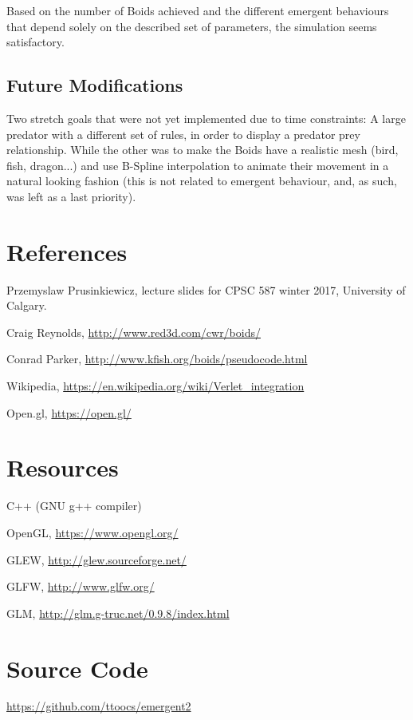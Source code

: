 \documentclass[12pt]{article}
\begin{document}
Based on the number of Boids achieved and the different emergent behaviours that depend solely on the described set of parameters, the simulation seems satisfactory.

\subsection*{Future Modifications}
Two stretch goals that were not yet implemented due to time constraints: A large predator with a different set of rules, in order to display a predator prey relationship. While the other was to make the Boids have a realistic mesh (bird, fish, dragon...) and use B-Spline interpolation to animate their movement in a natural looking fashion (this is not related to emergent behaviour, and, as such, was left as a last priority).

\section*{References}

\begin{enumerate}[label={[\arabic*]}]
	\item Przemyslaw Prusinkiewicz, lecture slides for CPSC 587 winter 2017, University of Calgary.
	
	\item Craig Reynolds, \url{http://www.red3d.com/cwr/boids/}
	
	\item Conrad Parker, \url{http://www.kfish.org/boids/pseudocode.html}
	
	\item Wikipedia,  \url{https://en.wikipedia.org/wiki/Verlet_integration}
	
	\item Open.gl, \url{https://open.gl/}
\end{enumerate}

\section*{Resources}

\begin{enumerate}[label={[\arabic*]}]
	\item C++ (GNU g++ compiler)
	
	\item OpenGL, \url{https://www.opengl.org/}
	
	\item GLEW, \url{http://glew.sourceforge.net/}
	
	\item GLFW, \url{http://www.glfw.org/}
	
	\item GLM, \url{http://glm.g-truc.net/0.9.8/index.html}
\end{enumerate}

\section*{Source Code}
\url{https://github.com/ttoocs/emergent2}
\end{document}
